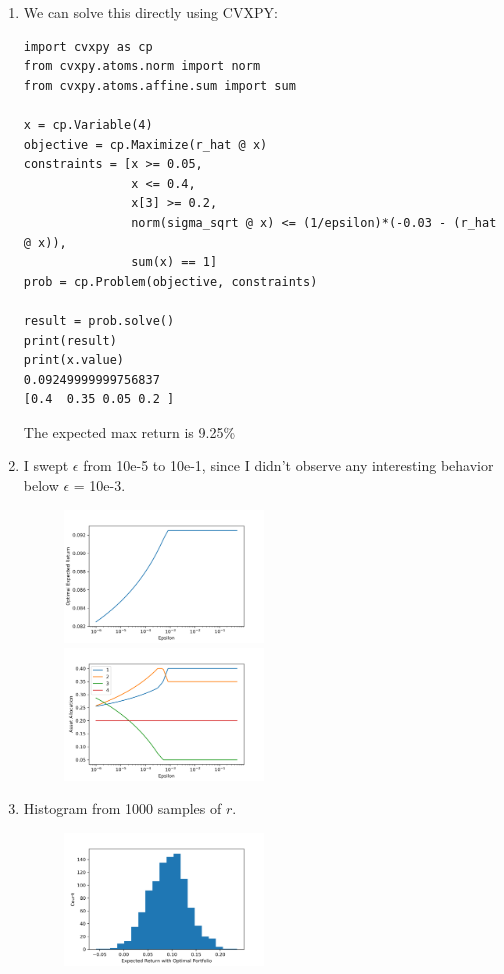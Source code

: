 \documentclass[11pt]{article}
\begin{document}
\begin{solution}
\begin{enumerate}
  \item We can solve this directly using CVXPY:
    \begin{verbatim}
import cvxpy as cp
from cvxpy.atoms.norm import norm
from cvxpy.atoms.affine.sum import sum

x = cp.Variable(4)
objective = cp.Maximize(r_hat @ x)
constraints = [x >= 0.05,
               x <= 0.4,
               x[3] >= 0.2,
               norm(sigma_sqrt @ x) <= (1/epsilon)*(-0.03 - (r_hat @ x)),
               sum(x) == 1]
prob = cp.Problem(objective, constraints)

result = prob.solve()
print(result)
print(x.value)
0.09249999999756837
[0.4  0.35 0.05 0.2 ]
    \end{verbatim}
    The expected max return is 9.25\%

  \item I swept $\epsilon$ from 10e-5 to 10e-1, since I didn't observe any interesting behavior below $\epsilon$ = 10e-3.
    \begin{figure}[H]
      \centerline{\includegraphics[width=0.5\textwidth]{problem4_sweep_epsilon.png}}
      \centerline{\includegraphics[width=0.5\textwidth]{problem4_area_plot.png}}
    \end{figure}

  \item Histogram from 1000 samples of $r$.
    \begin{figure}[H]
      \centerline{\includegraphics[width=0.5\textwidth]{problem4_monte_carlo.png}}
    \end{figure}


\end{enumerate}
\end{solution}
\end{document}
